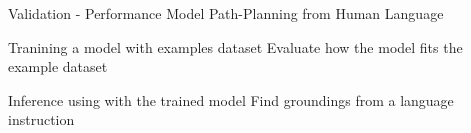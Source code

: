 \begin{frame}{Validation - Performance}{ Model Path-Planning from Human Language }

\begin{block}{Tranining a model with examples dataset}
Evaluate how the model fits the example dataset
\end{block}

\begin{block}{Inference using with the trained model}
Find groundings from a language instruction
\end{block}

\end{frame}




